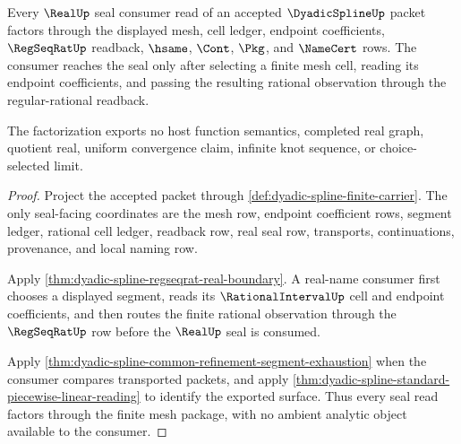 \begin{theorem}
\label{thm:dyadic-spline-real-seal-mesh-factorization}
Every $\RealUp$ seal consumer read of an accepted $\DyadicSplineUp$ packet factors through the displayed mesh, cell ledger, endpoint coefficients, $\RegSeqRatUp$ readback, $\hsame$, $\Cont$, $\Pkg$, and $\NameCert$ rows. The consumer reaches the seal only after selecting a finite mesh cell, reading its endpoint coefficients, and passing the resulting rational observation through the regular-rational readback.

The factorization exports no host function semantics, completed real graph, quotient real, uniform convergence claim, infinite knot sequence, or choice-selected limit.
\end{theorem}
\begin{proof}
Project the accepted packet through \autoref{def:dyadic-spline-finite-carrier}. The only seal-facing coordinates are the mesh row, endpoint coefficient rows, segment ledger, rational cell ledger, readback row, real seal row, transports, continuations, provenance, and local naming row.

Apply \autoref{thm:dyadic-spline-regseqrat-real-boundary}. A real-name consumer first chooses a displayed segment, reads its $\RationalIntervalUp$ cell and endpoint coefficients, and then routes the finite rational observation through the $\RegSeqRatUp$ row before the $\RealUp$ seal is consumed.

Apply \autoref{thm:dyadic-spline-common-refinement-segment-exhaustion} when the consumer compares transported packets, and apply \autoref{thm:dyadic-spline-standard-piecewise-linear-reading} to identify the exported surface. Thus every seal read factors through the finite mesh package, with no ambient analytic object available to the consumer.
\end{proof}

